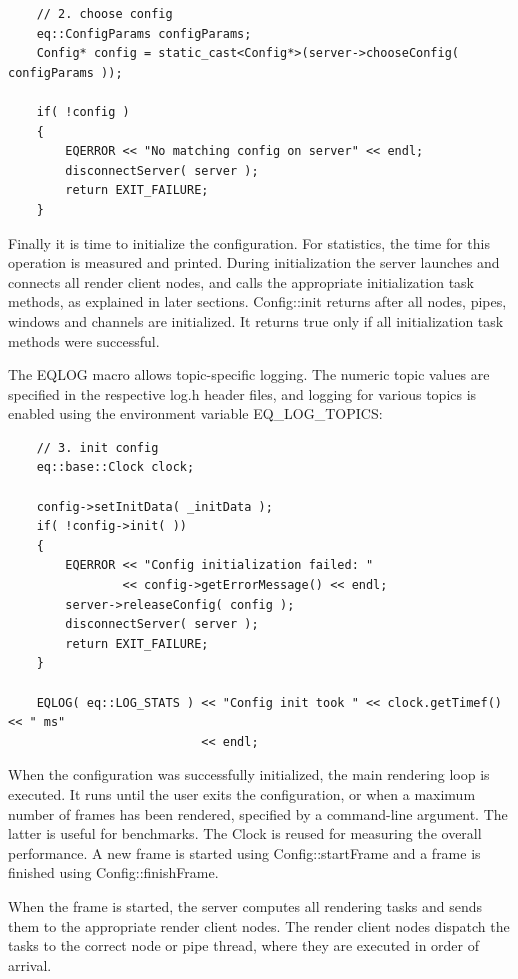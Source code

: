 \documentclass[10pt,a4]{scrartcl}
\begin{document}
{\footnotesize\begin{lstlisting}
    // 2. choose config
    eq::ConfigParams configParams;
    Config* config = static_cast<Config*>(server->chooseConfig( configParams ));

    if( !config )
    {
        EQERROR << "No matching config on server" << endl;
        disconnectServer( server );
        return EXIT_FAILURE;
    }
\end{lstlisting}}%

Finally it is time to initialize the configuration. For statistics, the
time for this operation is measured and printed. During initialization
the server launches and connects all render client nodes, and calls the
appropriate initialization task methods, as explained in later
sections. \textsf{Config::init} returns after all nodes, pipes,
windows and channels are initialized. It returns \textsf{true} only if
all initialization task methods were successful.

The \textsf{EQLOG} macro allows topic-specific logging. The numeric
topic values are specified in the respective \textsf{log.h} header
files, and logging for various topics is enabled using the environment
variable \textsf{EQ\_LOG\_TOPICS}:

{\footnotesize\begin{lstlisting}
    // 3. init config
    eq::base::Clock clock;

    config->setInitData( _initData );
    if( !config->init( ))
    {
        EQERROR << "Config initialization failed: " 
                << config->getErrorMessage() << endl;
        server->releaseConfig( config );
        disconnectServer( server );
        return EXIT_FAILURE;
    }

    EQLOG( eq::LOG_STATS ) << "Config init took " << clock.getTimef() << " ms"
                           << endl;
\end{lstlisting}}%

When the configuration was successfully initialized, the main rendering
loop is executed. It runs until the user exits the
configuration, or when a maximum number of frames has been rendered,
specified by a command-line argument. The latter is useful for
benchmarks. The \textsf{Clock} is reused for measuring the overall
performance. A new frame is started using \textsf{Config::startFrame}
and a frame is finished using \textsf{Config::finishFrame}.

When the frame is started, the server computes all rendering tasks and
sends them to the appropriate render client nodes. The render client
nodes dispatch the tasks to the correct node or pipe thread, where they
are executed in order of arrival.
\end{document}
